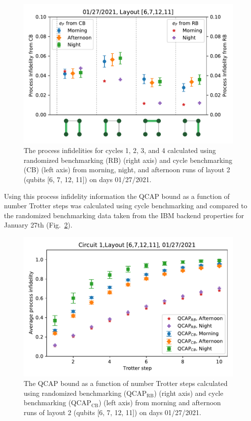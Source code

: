  
 

\begin{figure}[ht!]
    \includegraphics[scale=0.5]{ProcessInfidelities_CB_RB_Data_01_27_2021Layout2aligned.pdf}
    \caption{The process infidelities for cycles  1, 2, 3, and 4 calculated using randomized benchmarking (RB) (right axis) and cycle benchmarking (CB) (left axis) from morning, night, and afternoon runs of layout 2 (qubits [6, 7, 12, 11]) on days 01/27/2021.}
    \label{fig:processinfidelitiesStory6}
\end{figure}

Using this process infidelity information the QCAP bound as a function of number Trotter steps was calculated using cycle benchmarking and compared to the randomized benchmarking data taken from the IBM backend properties for January 27th (Fig.~\ref{fig:QCAPCB_RB_Story6}).

\begin{figure}[ht!]
    \includegraphics[scale=0.56]{QCAP_CB_RB_Data_01_27_2021_Layout_2C1.pdf}
    \caption{The QCAP bound as a function of number Trotter steps calculated using randomized benchmarking (QCAP$_{\text{RB}}$) (right axis) and cycle benchmarking (QCAP$_{\text{CB}}$) (left axis) from morning and afternoon runs of layout 2 (qubits [6, 7, 12, 11]) on days 01/27/2021.}
    \label{fig:QCAPCB_RB_Story6}
\end{figure}

